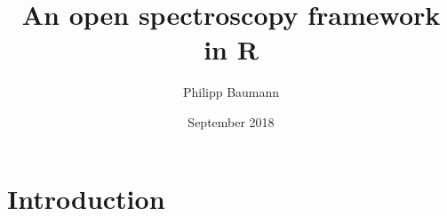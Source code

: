 \documentclass{article}
\title{An open spectroscopy framework in R}
\author{Philipp Baumann}
\date{September 2018}
\begin{document}
\maketitle

\section{Introduction}
\end{document}
